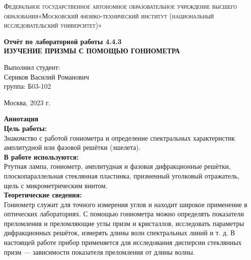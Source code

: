 \documentclass[a4paper, 12pt]{article}%
\begin{document}
	\begin{titlepage}
		\begin{center}
			\textsc{Федеральное государственное автономное образовательное учреждение высшего образования«Московский физико-технический институт (национальный исследовательский университет)»\\[5mm]
			}
			
			\vfill
			
			\textbf{Отчёт по лабораторной работы 4.4.3\\[3mm]
				ИЗУЧЕНИЕ ПРИЗМЫ С ПОМОЩЬЮ
				ГОНИОМЕТРА
				\\[50mm]
			}
			
		\end{center}
		
		\hfill
		\begin{minipage}{.5\textwidth}
			Выполнил студент:\\[2mm]
			Сериков Василий Романович\\[2mm]
			группа: Б03-102\\[5mm]
			
		\end{minipage}
		\vfill
		\begin{center}
			Москва, 2023 г.
		\end{center}
		
	\end{titlepage}
	
	\newpage
	\textbf{Аннотация}\\
	
	
	\textbf{Цель работы: }\\
	Знакомство с работой гониометра и определение спектральных характеристик амплитудной или фазовой решётки (эшелета).\\
	
	\textbf{В работе используются: }\\
	Ртутная лампа, гониометр, амплитудная
	и фазовая дифракционные решётки, плоскопараллельная стеклянная
	пластинка, призменный уголковый отражатель, щель с микрометрическим винтом.\\
	
	\textbf{Теоретические сведения: } \\
	
	Гониометр служит для точного измерения углов и находит широкое применение в оптических лабораториях. С помощью гониометра можно определять показатели преломления и преломляющие углы призм и кристаллов, исследовать параметры дифракционных решёток, измерять длины волн спектральных линий и т. д. В настоящей работе прибор применяется для исследования дисперсии стеклянных призм --- зависимости показателя преломления от длины волны.
	
\end{document}

